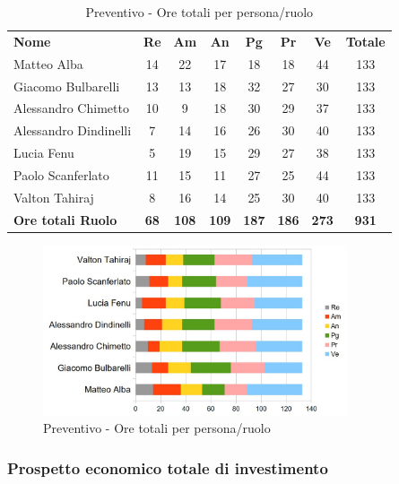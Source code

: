 		\begin{table} [h!]
			\begin{center}
				\begin{tabular} { m{3.5cm} c c c c c c c }
					\rowcolor{lightgray}
					\textbf{Nome} & \textbf{Re} & \textbf{Am} & \textbf{An} & \textbf{Pg} & \textbf{Pr} & \textbf{Ve} & \textbf{Totale} \\
					Matteo Alba & 14 & 22 & 17 & 18 & 18 & 44 & 133 \\
					Giacomo Bulbarelli & 13 & 13 & 18 & 32 & 27 & 30 & 133 \\
					Alessandro Chimetto & 10 & 9 & 18 & 30 & 29 & 37 & 133 \\
					Alessandro Dindinelli & 7 & 14 & 16 & 26 & 30 & 40 & 133 \\
					Lucia Fenu & 5 & 19 & 15 & 29 & 27 & 38 & 133 \\
					Paolo Scanferlato & 11 & 15 & 11 & 27 & 25 & 44 & 133 \\
					Valton Tahiraj & 8 & 16 & 14 & 25 & 30 & 40 & 133 \\
					\textbf{Ore totali Ruolo} & \textbf{68} & \textbf{108} & \textbf{109} & \textbf{187} & \textbf{186}& \textbf{273} & \textbf{931}
				\end{tabular}
				\caption{Preventivo - Ore totali per persona/ruolo}
			\end{center}
		\end{table}
	
		\begin{figure} [h!]
			\centering
			\includegraphics[width=0.8\textwidth]{res/img/grafici/OreTotaliInvestimento.jpg}
			\caption{Preventivo - Ore totali per persona/ruolo} 
		\end{figure}
	
	\newpage
	
	\subsubsection{Prospetto economico totale di investimento}
	
